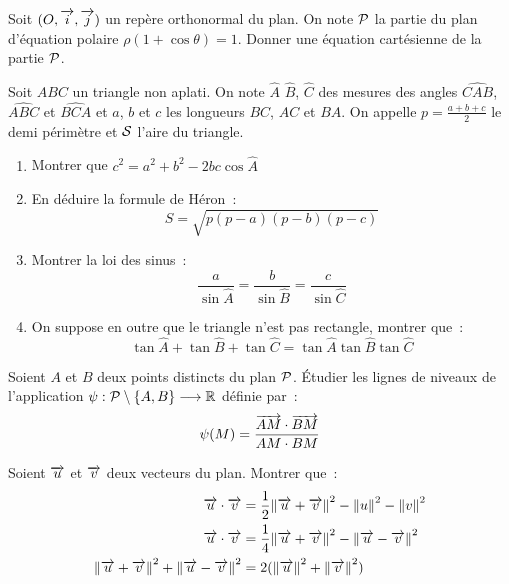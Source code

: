 \begin{exercice}
  Soit \((O, \vi, \vj)\) un repère orthonormal du plan. On note 
  \(\P\) la partie du plan d'équation polaire \(\rho(1 + 
  \cos\theta) = 1\). Donner une équation cartésienne de la partie 
  \(\P\).
\end{exercice}

\begin{exercice}
  Soit \(ABC\) un triangle non aplati. On note \(\hat{A}\) 
  \(\hat{B}\), \(\hat{C}\) des mesures des angles 
  \(\widehat{CAB}\), \(\widehat{ABC}\) et \(\widehat{BCA}\) et 
  \(a\), \(b\) et \(c\) les longueurs \(BC\), \(AC\) et \(BA\). On 
  appelle \(p = \frac{a + b + c}{2} \) le demi périmètre et \(\S\) 
  l'aire du triangle.
  \begin{enumerate}
    \item Montrer que \(c^2 = a^2 + b^2 - 2bc\cos \hat{A}\)
    \item En déduire la formule de Héron~:
      \begin{equation}
        S = \sqrt{p(p - a)(p - b)(p - c)}
      \end{equation}
    \item Montrer la loi des sinus~:
      \begin{equation}
        \frac{a}{\sin \hat{A}} = \frac{b}{\sin \hat{B}} = 
        \frac{c}{\sin \hat{C}}
      \end{equation}
    \item On suppose en outre que le triangle n'est pas rectangle, 
      montrer que~:
      \begin{equation}
        \tan \hat{A} + \tan \hat{B} + \tan \hat{C} = \tan \hat{A} 
        \tan \hat{B} \tan\hat{C}
      \end{equation}
  \end{enumerate}
\end{exercice}

\begin{exercice}
  Soient \(A\) et \(B\) deux points distincts du plan \(\P\). 
  Étudier les lignes de niveaux de l'application 
  \(\fonctionR{\psi}{\P\setminus\{A, B\}}{\R}\) définie par~:
  \begin{equation}
    \psi(M) = \frac{\vect{AM}\cdot\vect{BM}}{AM \cdot BM}
  \end{equation}
\end{exercice}

\begin{exercice}
  Soient \(\vu\) et \(\vv\) deux vecteurs du plan. Montrer que~:
  \begin{align}
    \vu \cdot \vv &= \frac{1}{2}{\norme{\vu + \vv}^2 - \norme{u}^2 
    - \norme{v}^2} \\
      \vu \cdot \vv &= \frac{1}{4}{\norme{\vu + \vv}^2 - 
      \norme{\vu - \vv}^2} \\
        \norme{\vu + \vv}^2 + \norme{\vu - \vv}^2 &= 
        2(\norme{\vu}^2 + \norme{\vv}^2)
  \end{align}
\end{exercice}

